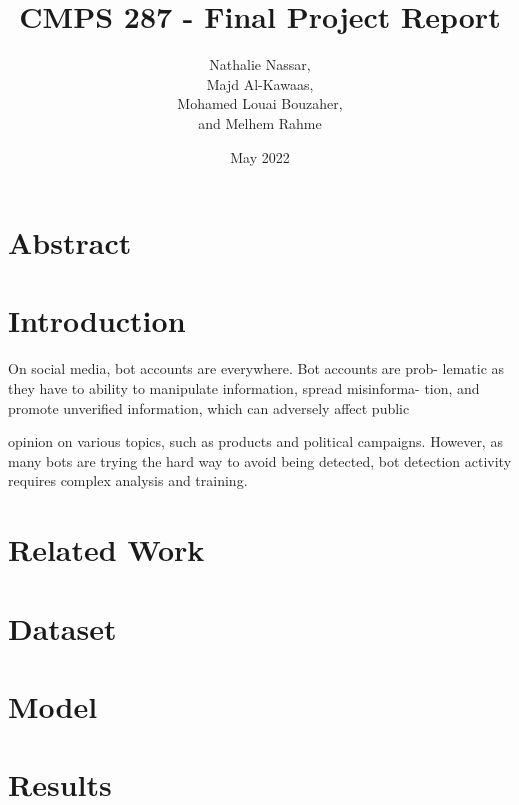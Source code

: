 \documentclass{article}
\title{CMPS 287 - Final Project Report}
\author{Nathalie Nassar, \\Majd Al-Kawaas,\\ Mohamed Louai Bouzaher,\\ and Melhem Rahme}
\date{May 2022}
\begin{document}
\maketitle

\section{Abstract}
\section{Introduction}

On social media, bot accounts are everywhere. Bot accounts are prob-
lematic as they have to ability to manipulate information, spread misinforma-
tion, and promote unverified information, which can adversely affect public

opinion on various topics, such as products and political campaigns.
However, as many bots are trying the hard way to avoid being detected,
bot detection activity requires complex analysis and training.
\section{Related Work}
\section{Dataset}
\section{Model}
\section{Results}
\end{document}
